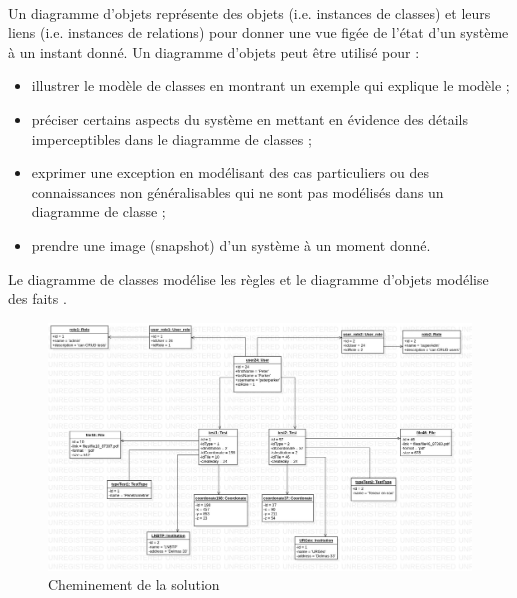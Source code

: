     \paragraph{}
    Un diagramme d'objets représente des objets (i.e. instances 
    de classes) et leurs liens (i.e. instances de relations) 
    pour donner une vue figée de l'état d'un système à un 
    instant donné. Un diagramme d'objets peut être utilisé pour :
    \begin{itemize}
        \item illustrer le modèle de classes en montrant un exemple qui explique le modèle ;
        \item  préciser certains aspects du système en mettant en évidence des détails imperceptibles dans le diagramme de classes ;
        \item exprimer une exception en modélisant des cas particuliers ou des connaissances non généralisables qui ne sont pas modélisés dans un diagramme de classe ;
        \item prendre une image (snapshot) d'un système à un moment donné.
    \end{itemize}
    Le diagramme de classes modélise les règles et le diagramme d'objets 
    modélise des faits \cite{audibert2009uml}.
    \begin{figure}[t]
        \centering
        \includegraphics[width=1\textwidth]{images/Analyse_des_besoins/ObjectDiagram.jpg}
        \caption{Cheminement de la solution}
        \label{fig:ObjectDiagram}
    \end{figure}